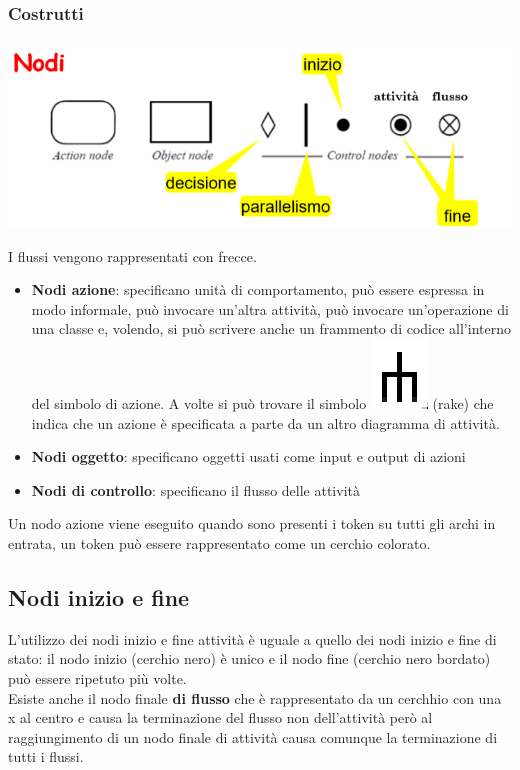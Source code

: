 \documentclass[12pt, a4paper]{report}
\begin{document}
\subsubsection{Costrutti}
\begin{center}
    \includegraphics[width=.7\textwidth]{Immagini/UMLActivityNodes.png}
\end{center}
I flussi vengono rappresentati con frecce.
\begin{itemize}
    \item \textbf{Nodi azione}: specificano unità di comportamento, può essere espressa in modo informale, può invocare un'altra attività, può invocare un'operazione di una classe e, volendo, si può scrivere anche un frammento di codice all'interno del simbolo di azione. A volte si può trovare il simbolo \includegraphics[height=2\fontcharht\font`\B]{Immagini/rake.png} (rake) che indica che un azione è specificata a parte da un altro diagramma di attività.
    \item \textbf{Nodi oggetto}: specificano oggetti usati come input e output di azioni
    \item \textbf{Nodi di controllo}: specificano il flusso delle attività
\end{itemize}
Un nodo azione viene eseguito quando sono presenti i token su tutti gli archi in entrata, un token può essere rappresentato come un cerchio colorato.
\subsection{Nodi inizio e fine}
L'utilizzo dei nodi inizio e fine attività è uguale a quello dei nodi inizio e fine di stato: il nodo inizio (cerchio nero) è unico e il nodo fine (cerchio nero  bordato) può essere ripetuto più volte.\\
Esiste anche il nodo  finale \textbf{di flusso} che è rappresentato da un cerchhio con una x al centro e causa la terminazione del flusso non dell'attività però al raggiungimento di un nodo finale di attività causa comunque la terminazione di tutti i flussi.
\end{document}
